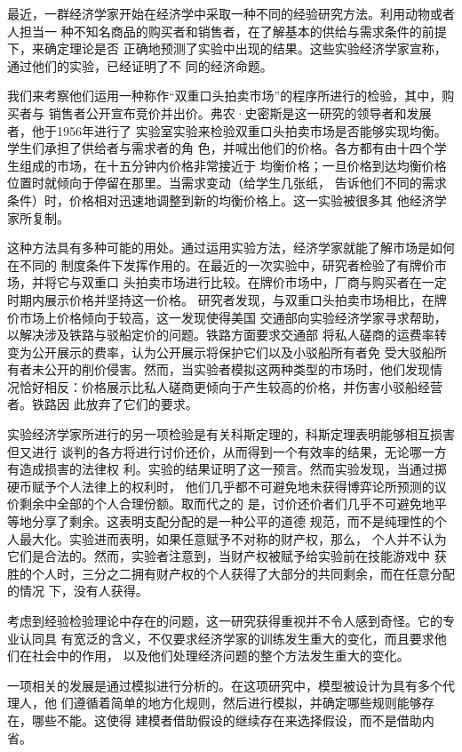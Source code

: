 最近，一群经济学家开始在经济学中采取一种不同的经验研究方法。利用动物或者人担当一
种不知名商品的购买者和销售者，在了解基本的供给与需求条件的前提下，来确定理论是否
正确地预测了实验中出现的结果。这些实验经济学家宣称，通过他们的实验，已经证明了不
同的经济命题。

我们来考察他们运用一种称作“双重口头拍卖市场”的程序所进行的检验，其中，购买者与
销售者公开宣布竞价并出价。弗农·史密斯是这一研究的领导者和发展者，他于1956年进行了
实验室实验来检验双重口头拍卖市场是否能够实现均衡。学生们承担了供给者与需求者的角
色，并喊出他们的价格。各方都有由十四个学生组成的市场，在十五分钟内价格非常接近于
均衡价格；一旦价格到达均衡价格位置时就倾向于停留在那里。当需求变动（给学生几张纸，
告诉他们不同的需求条件）时，价格相对迅速地调整到新的均衡价格上。这一实验被很多其
他经济学家所复制。

这种方法具有多种可能的用处。通过运用实验方法，经济学家就能了解市场是如何在不同的
制度条件下发挥作用的。在最近的一次实验中，研究者检验了有牌价市场，并将它与双重口
头拍卖市场进行比较。在牌价市场中，厂商与购买者在一定时期内展示价格并坚持这一价格。
研究者发现，与双重口头拍卖市场相比，在牌价市场上价格倾向于较高，这一发现使得美国
交通部向实验经济学家寻求帮助，以解决涉及铁路与驳船定价的问题。铁路方面要求交通部
将私人磋商的运费率转变为公开展示的费率，认为公开展示将保护它们以及小驳船所有者免
受大驳船所有者未公开的削价侵害。然而，当实验者模拟这两种类型的市场时，他们发现情
况恰好相反：价格展示比私人磋商更倾向于产生较高的价格，并伤害小驳船经营者。铁路因
此放弃了它们的要求。

实验经济学家所进行的另一项检验是有关科斯定理的，科斯定理表明能够相互损害但又进行
谈判的各方将进行讨价还价，从而得到一个有效率的结果，无论哪一方有造成损害的法律权
利。实验的结果证明了这一预言。然而实验发现，当通过掷硬币赋予个人法律上的权利时，
他们几乎都不可避免地未获得博弈论所预测的议价剩余中全部的个人合理份额。取而代之的
是，讨价还价者们几乎不可避免地平等地分享了剩余。这表明支配分配的是一种公平的道德
规范，而不是纯理性的个人最大化。实验进而表明，如果任意赋予不对称的财产权，那么，
个人并不认为它们是合法的。然而，实验者注意到，当财产权被赋予给实验前在技能游戏中
获胜的个人时，三分之二拥有财产权的个人获得了大部分的共同剩余，而在任意分配的情况
下，没有人获得。

考虑到经验检验理论中存在的问题，这一研究获得重视并不令人感到奇怪。它的专业认同具
有宽泛的含义，不仅要求经济学家的训练发生重大的变化，而且要求他们在社会中的作用，
以及他们处理经济问题的整个方法发生重大的变化。

一项相关的发展是通过模拟进行分析的。在这项研究中，模型被设计为具有多个代理人，他
们遵循着简单的地方化规则，然后进行模拟，并确定哪些规则能够存在，哪些不能。这使得
建模者借助假设的继续存在来选择假设，而不是借助内省。

